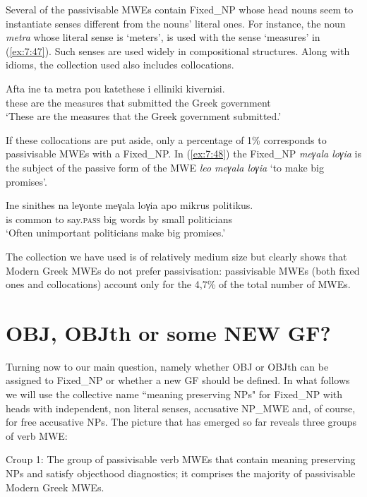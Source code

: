 \documentclass[output=paper]{langsci/langscibook}
\begin{document}
Several of the passivisable MWEs contain  Fixed\_NP whose head nouns seem to instantiate senses different from the nouns' literal ones. For instance, the noun {\normalfont \itshape  metra} whose literal sense is `meters',  is used with the sense `measures' in  (\ref{ex:7:47}).  Such senses are used widely in compositional structures. Along with  idioms, the collection used also includes collocations. 

\ea\label{ex:7:47}
\gll  Afta ine ta metra pou katethese i elliniki kivernisi. \\
          these are the measures that submitted the Greek government \\
\glt `These are the measures that the Greek government submitted.'
\z

If these collocations are put aside, only a percentage of 1\% corresponds to passivisable MWEs with a Fixed\_NP. In (\ref{ex:7:48}) the Fixed\_NP {\normalfont \itshape meγala loγia} is the subject of the passive form of the MWE {\normalfont \itshape leo meγala loγia} `to make big promises'.

\ea\label{ex:7:48}
\gll  Ine sinithes na leγonte meγala loγia apo mikrus politikus. \\
        is common to say.\textsc{pass} big words by small politicians  \\
\glt `Often unimportant politicians make big promises.'\\
\z

The collection we have used is of relatively medium size  but clearly shows that Modern Greek MWEs do not prefer passivisation: passivisable MWEs (both fixed ones and collocations) account only for the 4,7\% of the total number of MWEs.

\section{OBJ, OBJth or some NEW GF?}
\label{sec:5}
Turning now to our main question, namely whether OBJ or OBJth can be assigned to Fixed\_NP or whether a new GF  should be defined.  In what follows we will use the collective name ``meaning preserving NPs" for Fixed\_NP with heads with independent, non literal senses, accusative NP\_MWE and, of course, for free accusative NPs. The picture that has emerged so far reveals three groups of verb MWE:


Croup 1: The group of passivisable verb MWEs that contain meaning preserving NPs and satisfy objecthood diagnostics; it comprises the majority of passivisable Modern Greek MWEs.  
\end{document}
